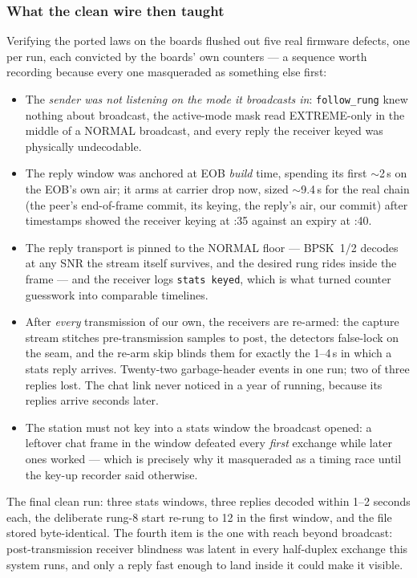 \subsubsection*{What the clean wire then taught}

Verifying the ported laws on the boards flushed out five real
firmware defects, one per run, each convicted by the boards' own
counters --- a sequence worth recording because every one masqueraded
as something else first:

\begin{itemize}
\item The \emph{sender was not listening on the mode it broadcasts
      in}: \texttt{follow\_rung} knew nothing about broadcast, the
      active-mode mask read EXTREME-only in the middle of a NORMAL
      broadcast, and every reply the receiver keyed was physically
      undecodable.
\item The reply window was anchored at EOB \emph{build} time,
      spending its first $\sim$2\,s on the EOB's own air; it arms at
      carrier drop now, sized $\sim$9.4\,s for the real chain (the
      peer's end-of-frame commit, its keying, the reply's air, our
      commit) after timestamps showed the receiver keying at :35
      against an expiry at :40.
\item The reply transport is pinned to the NORMAL floor --- BPSK~1/2
      decodes at any SNR the stream itself survives, and the desired
      rung rides inside the frame --- and the receiver logs
      \texttt{stats keyed}, which is what turned counter guesswork
      into comparable timelines.
\item After \emph{every} transmission of our own, the receivers are
      re-armed: the capture stream stitches pre-transmission samples
      to post, the detectors false-lock on the seam, and the re-arm
      skip blinds them for exactly the 1--4\,s in which a stats reply
      arrives. Twenty-two garbage-header events in one run; two of
      three replies lost. The chat link never noticed in a year of
      running, because its replies arrive seconds later.
\item The station must not key into a stats window the broadcast
      opened: a leftover chat frame in the window defeated every
      \emph{first} exchange while later ones worked --- which is
      precisely why it masqueraded as a timing race until the key-up
      recorder said otherwise.
\end{itemize}

The final clean run: three stats windows, three replies decoded within
1--2 seconds each, the deliberate rung-8 start re-rung to 12 in the
first window, and the file stored byte-identical. The fourth item is
the one with reach beyond broadcast: post-transmission receiver
blindness was latent in every half-duplex exchange this system runs,
and only a reply fast enough to land inside it could make it visible.


